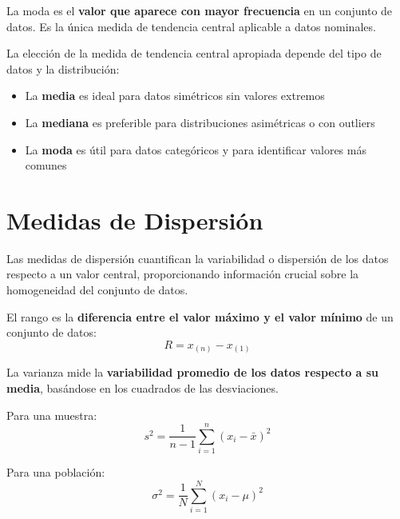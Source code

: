 \begin{definition}[Moda]
La moda es el \textbf{valor que aparece con mayor frecuencia} en un conjunto de datos. Es la única medida de tendencia central aplicable a datos nominales.
\end{definition}

\begin{remark}
La elección de la medida de tendencia central apropiada depende del tipo de datos y la distribución:
\begin{itemize}
    \item La \textbf{media} es ideal para datos simétricos sin valores extremos
    \item La \textbf{mediana} es preferible para distribuciones asimétricas o con outliers
    \item La \textbf{moda} es útil para datos categóricos y para identificar valores más comunes
\end{itemize}
\end{remark}

\section{Medidas de Dispersión}

Las medidas de dispersión cuantifican la variabilidad o dispersión de los datos respecto a un valor central, proporcionando información crucial sobre la homogeneidad del conjunto de datos.

\begin{definition}[Rango]
El rango es la \textbf{diferencia entre el valor máximo y el valor mínimo} de un conjunto de datos:
\begin{equation}
R = x_{(n)} - x_{(1)}
\end{equation}
\end{definition}

\begin{definition}[Varianza]
La varianza mide la \textbf{variabilidad promedio de los datos respecto a su media}, basándose en los cuadrados de las desviaciones.

Para una muestra:
\begin{equation}
s^2 = \frac{1}{n-1} \sum_{i=1}^{n} (x_i - \bar{x})^2
\end{equation}

Para una población:
\begin{equation}
\sigma^2 = \frac{1}{N} \sum_{i=1}^{N} (x_i - \mu)^2
\end{equation}
\end{definition}

